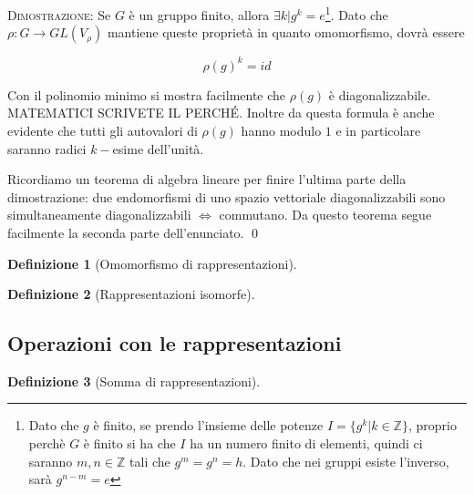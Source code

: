 \documentclass[11pt]{article}
\theoremstyle{plain}
\theoremstyle{definition}
\newtheorem{defn}{Definizione}[section]
\theoremstyle{remark}
\begin{document}
\textsc{Dimostrazione:} Se $G$ è un gruppo finito, allora $\exists k | g^k = e$\footnote{Dato che $g$ è finito, se prendo l'insieme delle potenze $I = \{g^k| k\in \mathbb{Z}\}$, proprio perchè $G$ è finito si ha che $I$ ha un numero finito di elementi, quindi ci saranno $m,n \in \mathbb{Z}$ tali che $g^m = g^n = h$. Dato che nei gruppi esiste l'inverso, sarà $g^{n-m} = e$}. Dato che $\rho:G\to GL(V_\rho)$ mantiene queste proprietà in quanto omomorfismo, dovrà essere

\[ \rho(g)^k = id\]

Con il polinomio minimo si mostra facilmente che $\rho(g)$ è diagonalizzabile. MATEMATICI SCRIVETE IL PERCH\'E. Inoltre da questa formula è anche evidente che tutti gli autovalori di $\rho(g)$ hanno modulo $1$ e in particolare saranno radici $k-$esime dell'unità.

Ricordiamo un teorema di algebra lineare per finire l'ultima parte della dimostrazione: due endomorfismi di uno spazio vettoriale diagonalizzabili sono simultaneamente diagonalizzabili $\Leftrightarrow$ commutano. Da questo teorema segue facilmente la seconda parte dell'enunciato. \qed





\begin{defn}[Omomorfismo di rappresentazioni] 




\end{defn}



\begin{defn}[Rappresentazioni isomorfe]


\end{defn}



\subsection{Operazioni con le rappresentazioni}

\begin{defn}[Somma di rappresentazioni]

\label{defn:somma di rappresentazioni}
\end{defn}
\end{document}
